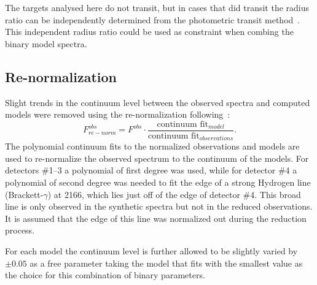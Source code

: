 The targets analysed here do not transit, but in cases that did transit the radius ratio can be independently determined from the photometric transit method~\citep{deeg_photometric_1998}.
This independent radius ratio could be used as constraint when combing the binary model spectra.


\subsection{Re-normalization}
\label{subsec:renorm}
Slight trends in the continuum level between the observed spectra and computed models were removed using the re-normalization following~\citet{passegger_fundamental_2016}:
\begin{equation}
F^{obs}_{re-norm} = F^{obs} \cdot \frac{\textrm{continuum fit}_{model}}{\textrm{continuum fit}_{observations}}.
\end{equation}
The polynomial continuum fits to the normalized observations and models are used to re-normalize the observed spectrum to the continuum of the models.
For detectors \#1--3 a polynomial of first degree was used, while for detector \#4 a polynomial of second degree was needed to fit the edge of a strong Hydrogen line (Brackett-\(\gamma\)) at 2166\nm{}, which lies just off of the edge of detector \#4.
This broad line is only observed in the synthetic spectra but not in the reduced observations.
It is assumed that the edge of this line was normalized out during the reduction process.

For each model the continuum level is further allowed to be slightly varied by \(\pm 0.05\) as a free parameter taking the model that fits with the smallest \textchisquared{} value as the choice for this combination of binary parameters.


